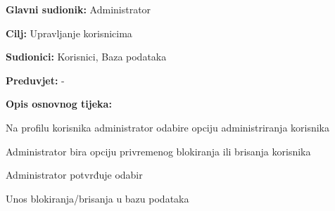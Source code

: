 				
					\noindent {}
					\begin{packed_item}
						
						\item \textbf{Glavni sudionik: }Administrator
						\item  \textbf{Cilj:} Upravljanje korisnicima 
						\item  \textbf{Sudionici:} Korisnici, Baza podataka
						\item  \textbf{Preduvjet:} -
						\item  \textbf{Opis osnovnog tijeka:}
						
						\item[] \begin{packed_enum}
							
							\item Na profilu korisnika administrator odabire opciju administriranja korisnika
							\item Administrator bira opciju privremenog blokiranja ili brisanja korisnika
							\item Administrator potvrđuje odabir
							\item Unos blokiranja/brisanja u bazu podataka
						\end{packed_enum}
						
					\end{packed_item}
				
